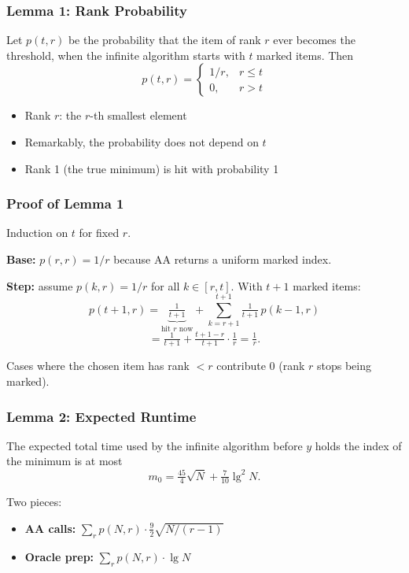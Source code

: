 \begin{frame}
  \frametitle{Lemma 1: Rank Probability}
  \begin{lemma}
    Let $p(t, r)$ be the probability that the item of rank $r$ ever becomes the threshold, when the infinite algorithm starts with $t$ marked items. Then
    \[
      p(t, r) =
      \begin{cases}
        1/r, & r \le t \\
        0, & r > t
      \end{cases}
    \]
  \end{lemma}

  \vspace{0.4cm}
  \begin{itemize}
    \item Rank $r$: the $r$-th smallest element
    \item Remarkably, the probability does not depend on $t$
    \item Rank 1 (the true minimum) is hit with probability 1
  \end{itemize}
\end{frame}

\begin{frame}
  \frametitle{Proof of Lemma 1}
  Induction on $t$ for fixed $r$.

  \vspace{0.3cm}
  \textbf{Base:} $p(r, r) = 1/r$ because AA returns a uniform marked index.

  \vspace{0.3cm}
  \textbf{Step:} assume $p(k,r) = 1/r$ for all $k \in [r, t]$. With $t+1$ marked items:
  {\small
  \[
    p(t+1, r) = \underbrace{\tfrac{1}{t+1}}_{\text{hit $r$ now}}
    + \sum_{k=r+1}^{t+1} \tfrac{1}{t+1}\, p(k-1, r)
  \]
  \[
    = \tfrac{1}{t+1} + \tfrac{t+1-r}{t+1}\cdot\tfrac{1}{r}
    = \tfrac{1}{r}.
  \]
  }

  \vspace{0.3cm}
  {\small Cases where the chosen item has rank $<r$ contribute $0$ (rank $r$ stops being marked).}
\end{frame}

\begin{frame}
  \frametitle{Lemma 2: Expected Runtime}
  \begin{lemma}
    The expected total time used by the infinite algorithm before $y$ holds the index of the minimum is at most
    \[
      m_0 = \tfrac{45}{4}\sqrt{N} + \tfrac{7}{10}\lg^2 N.
    \]
  \end{lemma}

  \vspace{0.3cm}
  Two pieces:
  \begin{itemize}
    \item \textbf{AA calls:} $\sum_r p(N,r)\cdot \tfrac{9}{2}\sqrt{N/(r-1)}$
    \item \textbf{Oracle prep:} $\sum_r p(N,r)\cdot \lg N$
  \end{itemize}
\end{frame}

